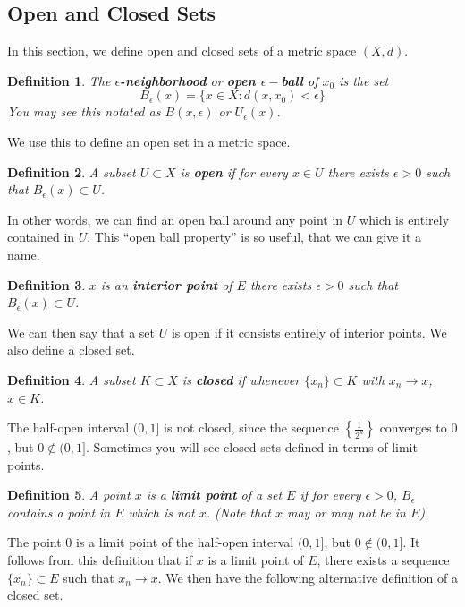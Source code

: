 \documentclass[12pt]{amsart}         %
\newtheorem{definition}{Definition}[section]
\theoremstyle{remark}
\begin{document}
\subsection{Open and Closed Sets}

In this section, we define open and closed sets of a metric space $(X,d)$.

\begin{definition}
The \textbf{$\epsilon$-neighborhood} or \textbf{open $\epsilon-$ball} of $x_0$ is the set
\[
B_\epsilon(x) = \{ x \in X : d(x,x_0) < \epsilon \}
\]
You may see this notated as $B(x, \epsilon)$ or $U_\epsilon(x)$.
\end{definition}

We use this to define an open set in a metric space.

\begin{definition}
A subset $U \subset X$ is \textbf{open} if for every $x \in U$ there exists $\epsilon > 0$ such that $B_\epsilon(x) \subset U$.
\end{definition}

In other words, we can find an open ball around any point in $U$ which is entirely contained in $U$. This ``open ball property'' is so useful, that we can give it a name.

\begin{definition}
$x$ is an \textbf{interior point} of $E$ there exists $\epsilon > 0$ such that $B_\epsilon(x) \subset U$.
\end{definition}

We can then say that a set $U$ is open if it consists entirely of interior points. We also define a closed set.

\begin{definition}
A subset $K \subset X$ is \textbf{closed} if whenever $\{x_n\} \subset K$ with $x_n \rightarrow x$, $x \in K$.
\end{definition}

The half-open interval $(0,1]$ is not closed, since the sequence $\left\{ \frac{1}{2^k} \right\}$ converges to $0$, but $0 \notin (0,1]$. Sometimes you will see closed sets defined in terms of limit points.

\begin{definition}
A point $x$ is a \textbf{limit point} of a set $E$ if for every $\epsilon > 0$, $B_\epsilon$ contains a point in $E$ which is not $x$. (Note that $x$ may or may not be in $E$).
\end{definition}

The point $0$ is a limit point of the half-open interval $(0,1]$, but $0 \notin (0,1]$. It follows from this definition that if $x$ is a limit point of $E$, there exists a sequence $\{x_n\} \subset E$ such that $x_n \rightarrow x$. We then have the following alternative definition of a closed set.
\end{document}
